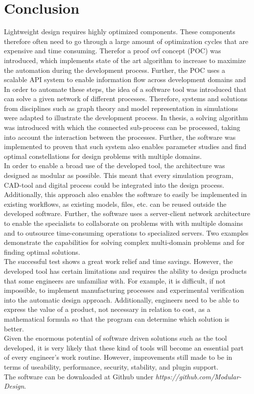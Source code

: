 \section{Conclusion}

Lightweight design requires highly optimized components.
These components therefore often need to go through a large amount of optimization cycles that are expensive and time consuming.
Therefor a proof ovf concept (POC) was introduced, which implements state of the art algorithm to increase to maximize the automation during the development process.
Further, the POC uses a scalable API system to enable information flow across development domains and 
In order to automate these steps, the idea of a software tool was introduced that can solve a given network of different processes.
Therefore, systems and solutions from disciplines such as graph theory and model representation in simulations were adapted to illustrate the development process.
In thesis, a solving algorithm was introduced with which the connected sub-process can be processed, taking into account the interaction between the processes.
Further, the software was implemented to proven that such system also enables parameter studies and find optimal constellations for design problems with multiple domains.\\
In order to enable a broad use of the developed tool, the architecture was designed as modular as possible.
This meant that every simulation program, CAD-tool and digital process could be integrated into the design process.
Additionally, this approach also enables the software to easily be implemented in existing workflows, as existing models, files, etc. can be reused outside the developed software.
Further, the software uses a server-client network architecture to enable the specialists to collaborate on problems with with multiple domains and to outsource time-consuming operations to specialized servers.
Two examples demonstrate the capabilities for solving complex multi-domain problems and for finding optimal solutions.\\
The successful test shows a great work relief and time savings.
However, the developed tool has certain limitations and requires the ability to design products that some engineers are unfamiliar with.
For example, it is difficult, if not impossible, to implement manufacturing processes and experimental verification into the automatic design approach.
Additionally, engineers need to be able to express the value of a product, not necessary in relation to cost, as a mathematical formula so that the program can determine which solution is better.\\
Given the enormous potential of software driven solutions such as the tool developed, it is very likely that these kind of tools will become an essential part of every engineer's work routine.
However, improvements still made to be in terms of useability, performance, security, stability, and plugin support.\\

The software can be downloaded at Github under \emph{https://github.com/Modular-Design}.
